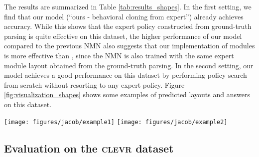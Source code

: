 \documentclass[10pt,twocolumn,letterpaper]{article}
\newcommand{\clevr}{\textsc{clevr}\xspace}
\begin{document}
The results are summarized in Table \ref{tab:results_shapes}. In the first setting, we find that our model (``ours - behavioral cloning from expert'') already achieves  accuracy. While this shows that the expert policy constructed from ground-truth parsing is quite effective on this dataset, the higher performance of our model compared to the previous NMN \cite{andreas16neural} also suggests that our implementation of modules is more effective than \cite{andreas16neural}, since the NMN is also trained with the same expert module layout obtained from the ground-truth parsing. In the second setting, our model achieves a good performance on this dataset by performing policy search from scratch without resorting to any expert policy. Figure \ref{fig:visualization_shapes} shows some examples of predicted layouts and answers on this dataset.

\begin{figure*}
\centering
\vspace{-0.5cm}
\texttt{[image: figures/jacob/example1]}
\hspace{6em}
\texttt{[image: figures/jacob/example2]}\vspace{-0.2cm}
\caption{Question answering examples on the \clevr dataset. On the left, it
can be seen that the model successfully locates the matte green ball,
attends to all the other objects of the same size, and then correctly identifies
that there are 4 such objects (excluding the initial ball). On the right, it can
be seen the various modules similarly assume intuitive semantics. 
Of particular interest is
the second \texttt{find} module, which picks up the word \emph{right} in addition
to \emph{metallic red thing}: this suggests that model can use the fact that
downstream computation will look to the right of the detected object to focus
its initial search in the left half of the image, a behavior supported by our
attentive approach but not a conventional linguistic analysis of the question.}
\label{fig:clevr_examples}
\vspace{-0.2cm}
\end{figure*}

\subsection{Evaluation on the \clevr dataset}
\label{sec:exp_clevr}
\end{document}
